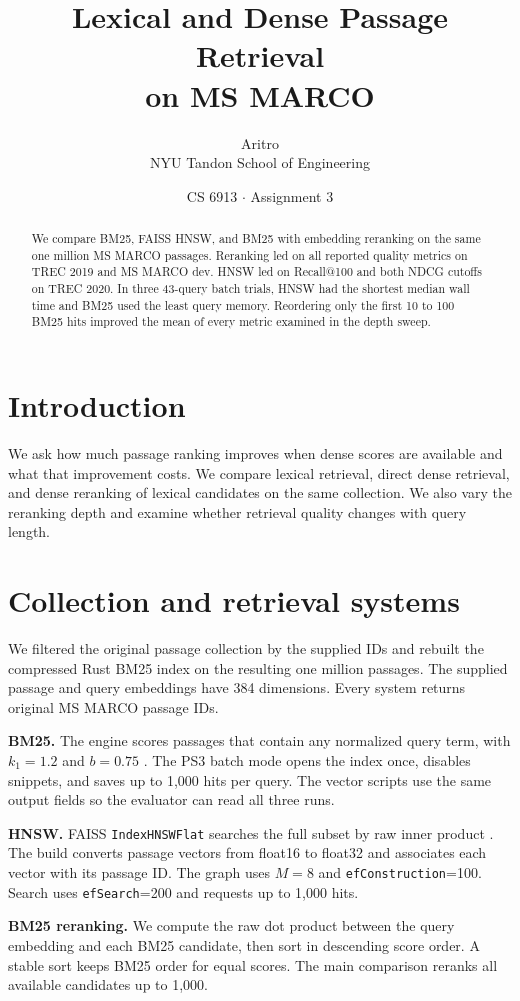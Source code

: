 \documentclass[11pt,letterpaper]{article}
\title{\bfseries Lexical and Dense Passage Retrieval\\on MS MARCO}
\author{Aritro \\ \small NYU Tandon School of Engineering}
\date{\small CS 6913 \enspace $\cdot$ \enspace Assignment 3}
\begin{document}
\maketitle

\begin{abstract}
We compare BM25, FAISS HNSW, and BM25 with embedding reranking on the same one million MS MARCO passages. Reranking led on all reported quality metrics on TREC 2019 and MS MARCO dev. HNSW led on Recall@100 and both NDCG cutoffs on TREC 2020. In three 43-query batch trials, HNSW had the shortest median wall time and BM25 used the least query memory. Reordering only the first 10 to 100 BM25 hits improved the mean of every metric examined in the depth sweep.
\end{abstract}


\section{Introduction}
We ask how much passage ranking improves when dense scores are available and what that improvement costs. We compare lexical retrieval, direct dense retrieval, and dense reranking of lexical candidates on the same collection. We also vary the reranking depth and examine whether retrieval quality changes with query length.
\section{Collection and retrieval systems}
We filtered the original passage collection by the supplied IDs and rebuilt the compressed Rust BM25 index on the resulting one million passages. The supplied passage and query embeddings have 384 dimensions. Every system returns original MS MARCO passage IDs.

\textbf{BM25.} The engine scores passages that contain any normalized query term, with $k_1=1.2$ and $b=0.75$ \cite{bm25}. The PS3 batch mode opens the index once, disables snippets, and saves up to 1,000 hits per query. The vector scripts use the same output fields so the evaluator can read all three runs.

\textbf{HNSW.} FAISS \texttt{IndexHNSWFlat} searches the full subset by raw inner product \cite{hnsw,faiss}. The build converts passage vectors from float16 to float32 and associates each vector with its passage ID. The graph uses $M=8$ and \texttt{efConstruction}=100. Search uses \texttt{efSearch}=200 and requests up to 1,000 hits.

\textbf{BM25 reranking.} We compute the raw dot product between the query embedding and each BM25 candidate, then sort in descending score order. A stable sort keeps BM25 order for equal scores. The main comparison reranks all available candidates up to 1,000.
\end{document}
